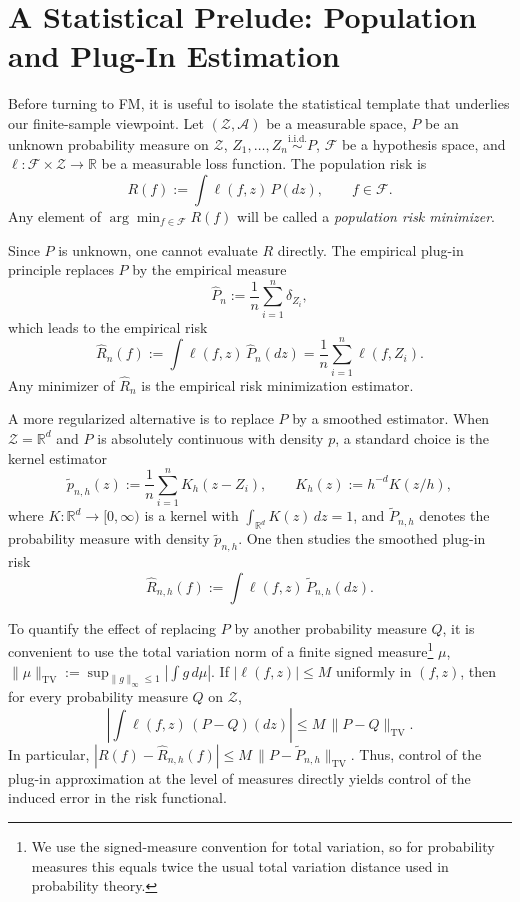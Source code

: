 \documentclass[a4paper,11pt]{article}
\theoremstyle{plain}
\theoremstyle{definition}
\begin{document}



\section{A Statistical Prelude: Population and Plug-In Estimation}
\label{sec:plugin}

Before turning to FM, it is useful to isolate the statistical template that underlies our finite-sample viewpoint. Let $(\mathcal Z,\mathcal A)$ be a measurable space, $P$ be an unknown probability measure on $\mathcal Z$, $Z_1,\dots,Z_n \overset{\mathrm{i.i.d.}}{\sim} P$, $\mathcal F$ be a hypothesis space, and $\ell:\mathcal F\times\mathcal Z\to\mathbb R$ be a measurable loss function. The population risk is
\[
R(f):=\int \ell(f,z)\,P(dz), \qquad f\in\mathcal F.
\]
Any element of
$\arg\min_{f\in\mathcal F} R(f)
$
will be called a \emph{population risk minimizer}.

Since $P$ is unknown, one cannot evaluate $R$ directly. The empirical plug-in principle replaces $P$ by the empirical measure
\[
\hat P_n:=\frac1n\sum_{i=1}^n \delta_{Z_i},
\]
which leads to the empirical risk
\[
\hat R_n(f):=\int \ell(f,z)\,\hat P_n(dz)
=\frac1n\sum_{i=1}^n \ell(f,Z_i).
\]
Any minimizer of $\hat R_n$ is the empirical risk minimization estimator.

A more regularized alternative is to replace $P$ by a smoothed estimator. When $\mathcal Z=\mathbb R^d$ and $P$ is absolutely continuous with density $p$, a standard choice is the kernel estimator
\[
\tilde p_{n,h}(z):=\frac1n\sum_{i=1}^n K_h(z-Z_i),
\qquad
K_h(z):=h^{-d}K(z/h),
\]
where $K:\mathbb R^d\to[0,\infty)$ is a kernel with $\int_{\mathbb R^d} K(z)\,dz=1$, and $\tilde P_{n,h}$ denotes the probability measure with density $\tilde p_{n,h}$. One then studies the smoothed plug-in risk
\[
\hat R_{n,h}(f):=\int \ell(f,z)\,\tilde P_{n,h}(dz).
\]

To quantify the effect of replacing $P$ by another probability measure $Q$, it is convenient to use the total variation norm of a finite signed measure\footnote{We use the signed-measure convention for total variation, so for probability measures this equals twice the usual total variation distance used in probability theory.} $\mu$,
\(
\|\mu\|_{\mathrm{TV}}
:=\sup_{\|g\|_\infty\le 1}\left|\int g\,d\mu\right|.
\)
If $|\ell(f,z)|\le M$ uniformly in $(f,z)$, then for every probability measure $Q$ on $\mathcal Z$,
\[
\left| \int \ell(f,z)\,(P-Q)(dz)\right|
\le M\,\|P-Q\|_{\mathrm{TV}}.
\]
In particular,
$|R(f)-\hat R_{n,h}(f)|
\le M\,\|P-\tilde P_{n,h}\|_{\mathrm{TV}}.$
Thus, control of the plug-in approximation at the level of measures directly yields control of the induced error in the risk functional.
\end{document}
